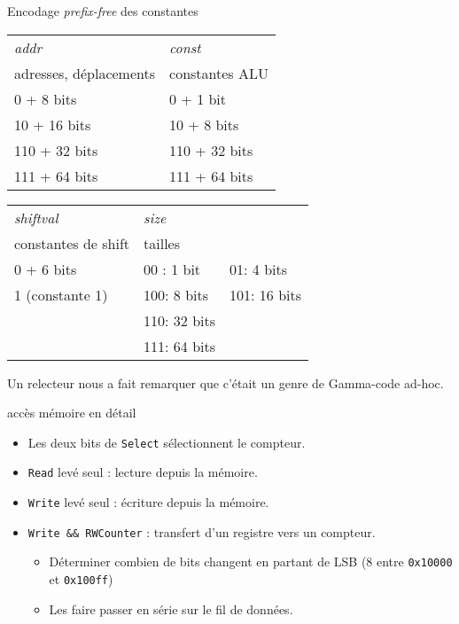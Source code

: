 \documentclass[slidetop,11pt,table]{beamer}
\begin{document}
\begin{frame}{Encodage \emph{prefix-free} des constantes}

  \begin{center}
    \begin{tabular}{|l||l|}
      \hline
      \emph{addr}&  \emph{const}  \\
      adresses, déplacements & constantes ALU    \\
      \hline
      0 + 8 bits               & 0 + 1 bit      \\ 
      10 + 16 bits             & 10 + 8 bits    \\
      110 + 32 bits            & 110 + 32 bits  \\
      111 + 64 bits            & 111 + 64 bits   \\
      \hline
    \end{tabular}
    
    \begin{tabular}{|l||ll|}
      \hline
      \emph{shiftval} & \emph{size}& \\
      constantes de shift & tailles     &              \\
      \hline
      0 + 6 bits          & 00 : 1 bit &  01: 4 bits  \\ 
      1  (constante 1)    & 100: 8 bits& 101: 16 bits \\
                      & 110: 32 bits &            \\
                      & 111: 64 bits &             \\
      \hline
    \end{tabular}
  \end{center}
  Un relecteur nous a fait remarquer que c'était un genre de Gamma-code ad-hoc.
\end{frame}


\begin{frame}{accès mémoire en détail}
  \begin{center}
    \scalebox{0.4}{\proco}
  \end{center}
  \begin{itemize}
  \item Les deux bits de \texttt{Select} sélectionnent le compteur.
  \item \texttt{Read} levé seul : lecture depuis la mémoire.
  \item \texttt{Write} levé seul : écriture depuis la mémoire.
  \item \texttt{Write \&\& RWCounter} : transfert d'un registre vers un compteur.
    \begin{itemize}
    \item Déterminer combien de bits changent en partant de LSB (8 entre \texttt{0x10000} et \texttt{0x100ff})
    \item Les faire passer en série sur le fil de données.
    \end{itemize}
  \end{itemize}
\end{frame}
\end{document}
